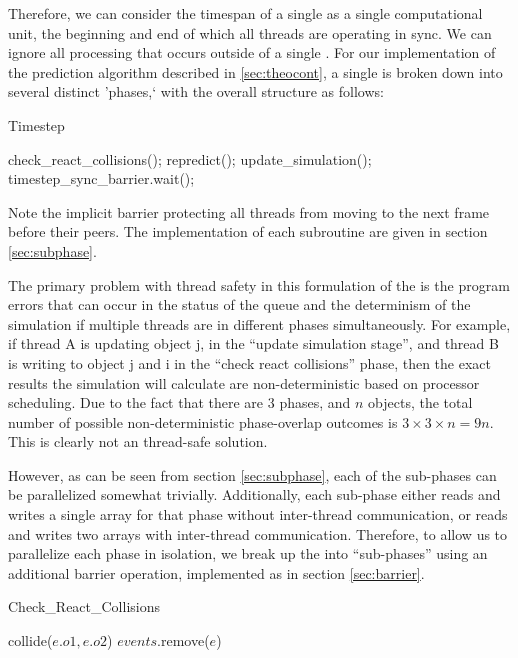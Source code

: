\documentclass[CEJCS,PDF]{cej} %
\begin{document}
Therefore, we can consider the timespan of a single  as a single computational unit, the beginning and end of which all threads are operating in sync.  We can ignore
all processing that occurs outside of a single .  For our implementation of the prediction algorithm described in \ref{sec:theocont}, a single  is broken down
into several distinct 'phases,` with the overall structure as follows:

\begin{algorithm}
\caption{Timestep}
\begin{algorithmic}
\STATE check\_react\_collisions();
\STATE repredict();
\STATE update\_simulation();
\STATE timestep\_sync\_barrier.wait();
\end{algorithmic}
\end{algorithm}

Note the implicit barrier protecting all threads from moving to the next frame before their peers.  The implementation of each subroutine are given in section \ref{sec:subphase}.

The primary problem with thread safety in this formulation of the  is the program errors that can occur in the status of the queue and the determinism of the simulation
if multiple threads are in different phases simultaneously.  For example, if thread A is updating object j, in the ``update simulation stage'', and thread B is writing to object 
j and i in the ``check react collisions'' phase, then the exact results the simulation will calculate are non-deterministic based on processor scheduling.  
Due to the fact that there are 3 phases, and $n$ objects, the total number of possible non-deterministic phase-overlap outcomes is $3\times3\times n=9n$.  This is clearly not an thread-safe solution.

However, as can be seen from section \ref{sec:subphase}, each of the sub-phases can be parallelized somewhat trivially.  Additionally, each sub-phase either reads and writes
a single array for that phase without inter-thread communication, or reads and writes two arrays with inter-thread communication.  Therefore, to allow us to parallelize each
phase in isolation, we break up the  into ``sub-phases'' using an additional barrier operation, implemented as in section \ref{sec:barrier}.  

\begin{algorithm}
\caption{Check\_React\_Collisions}
\begin{algorithmic}
\STATE {}
	\STATE {}
		\STATE {}
		\STATE collide($e.o1,e.o2$)
	\ENDIF
	\STATE {}
	\STATE $events$.remove($e$)
\ENDFOR
\end{algorithmic}
\end{algorithm}
\end{document}

